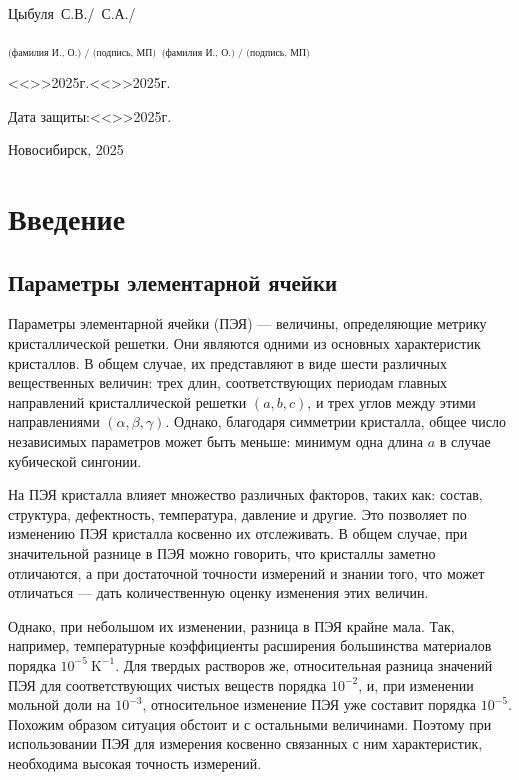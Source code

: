 \documentclass[a4paper,14pt]{extarticle}
\newcommand{\unit}[1]{ \ \text{#1}}
\newcounter{x}
\newcommand{\Repeat}[2]{\forloop{x}{0}{\value{x} < #1}{#2}}
\newcommand{\writedate}{<<\Repeat{2}{\ldots}>>\Repeat{5}{\ldots}2025г.}
\begin{document}
\begin{titlepage}
\begin{spacing}{1.15}
\noindent
Цыбуля~С.В./\Repeat{4}{\ldots}~С.А./\Repeat{4}{\ldots}

\noindent
$_\text{(фамилия И., О.) / (подпись, МП)}$ \hfill $_\text{(фамилия И., О.) / (подпись, МП)}$
\vspace{10pt}

\noindent
\writedate\hfill\writedate{}
\vspace{8mm}

\hfill Дата защиты:\writedate{}
\vspace{8mm}

\begin{center}
    Новосибирск, 2025
\end{center}

\end{spacing}
\end{titlepage}
\newpage
\tableofcontents
\newpage
\section{Введение}

\subsection{Параметры элементарной ячейки}

Параметры элементарной ячейки (ПЭЯ) --- величины, определяющие метрику кристаллической решетки.
Они являются одними из основных характеристик кристаллов.
В общем случае, их представляют в виде шести различных вещественных величин: трех длин, соответствующих периодам главных направлений кристаллической решетки $(a, b, c)$, и трех углов между этими направлениями $(\alpha, \beta, \gamma)$.
Однако, благодаря симметрии кристалла, общее число независимых параметров может быть меньше: минимум одна длина $a$ в случае кубической сингонии.

На ПЭЯ кристалла влияет множество различных факторов, таких как: состав, структура, дефектность, температура, давление и другие.
Это позволяет по изменению ПЭЯ кристалла косвенно их отслеживать.
В общем случае, при значительной разнице в ПЭЯ можно говорить, что кристаллы заметно отличаются, а при достаточной точности измерений и знании того, что может отличаться --- дать количественную оценку изменения этих величин.

Однако, при небольшом их изменении, разница в ПЭЯ крайне мала.
Так, например, температурные коэффициенты расширения большинства материалов порядка $10^{-5} \unit{K}^{-1}$.
Для твердых растворов же, относительная разница значений ПЭЯ для соответствующих чистых веществ порядка $10^{-2}$, и, при изменении мольной доли на $10^{-3}$, относительное изменение ПЭЯ уже составит порядка $10^{-5}$.
Похожим образом ситуация обстоит и с остальными величинами.
Поэтому при использовании ПЭЯ для измерения косвенно связанных с ним характеристик, необходима высокая точность измерений.
\end{document}

